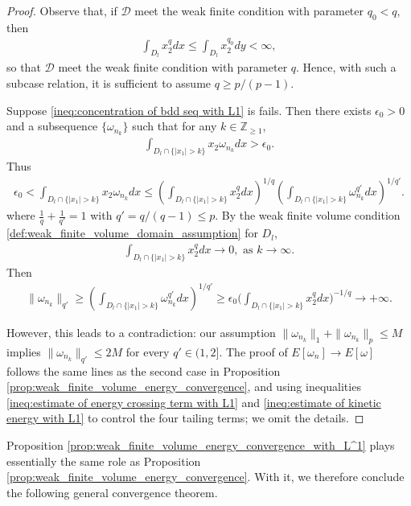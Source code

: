\documentclass[11pt,letterpaper]{amsart}
\theoremstyle{definition}
\theoremstyle{remark}
\newcommand{\D}{\mathcal{D}}
\renewcommand{\tt}[1]{\text{#1}}
\numberwithin{equation}{section}
\begin{document}
\begin{proof}
Observe that, if $\D$ meet the weak finite condition with parameter $q_0<q$, then 
\begin{align*}
    \int_{D_l} x_2^q dx \leq \int_{D_l} x_2^{q_0} dy <\infty,
\end{align*}
so that $\D$ meet the weak finite condition with parameter $q$. Hence, with such a subcase relation, it is sufficient to assume $q \geq p/(p-1)$. 

Suppose \eqref{ineq:concentration of bdd seq with L1} is fails. Then there exists $\epsilon_0>0$ and a subsequence $\{\omega_{n_k}\}$ such that for any $k \in \mathbb{Z}_{\geq 1}$,
\begin{align*}
    \int_{D_l \cap \{|x_1|>k\}} x_2 \omega_{n_k} dx > \epsilon_0.
\end{align*}
Thus 
\begin{align*}
    \epsilon_0 < \int_{D_l \cap \{|x_1|>k\}} x_2 \omega_{n_k} dx \leq  \left(\int_{D_l \cap \{|x_1|>k\}} x_2^{q} dx\right)^{1/{q}}\left(\int_{D_l \cap \{|x_1|>k\}} \omega_{n_k}^{q'} dx\right)^{1/{q'}}.
\end{align*}
where $\frac{1}{q}+\frac{1}{q'}=1$ with $q'= q/(q-1) \leq p $. By the weak finite volume condition \eqref{def:weak_finite_volume_domain_assumption} for $D_l$,
\begin{align*}
    \int_{D_l \cap \{|x_1|>k\}} x_2^q dx \rightarrow 0, \tt{ as } k \rightarrow \infty.
\end{align*}
Then 
\begin{align*}
    \|\omega_{n_k}\|_{q'} \geq (\int_{D_l \cap \{|x_1|>k\}} \omega_{n_k}^{q'} dx)^{1/q'} \geq \epsilon_0 \Big(\int_{D_l \cap \{|x_1|>k\}} x_2^q dx\Big)^{-1/q}\rightarrow +\infty.
\end{align*}

However, this leads to a contradiction: our assumption \(\|\omega_{n_k}\|_1 + \|\omega_{n_k}\|_p \le M\) implies \(\|\omega_{n_k}\|_{q'} \le 2M\) for every \(q' \in (1,2]\). The proof of \(E[\omega_n] \to E[\omega]\) follows the same lines as the second case in Proposition \ref{prop:weak_finite_volume_energy_convergence}, and using inequalities \eqref{ineq:estimate of energy crossing term with L1} and \eqref{ineq:estimate of kinetic energy with L1} to control the four tailing terms; we omit the details.

\end{proof}

Proposition  \ref{prop:weak_finite_volume_energy_convergence_with_L^1} plays essentially the same role as Proposition \ref{prop:weak_finite_volume_energy_convergence}. With it, we therefore conclude the following general convergence theorem.
\end{document}
